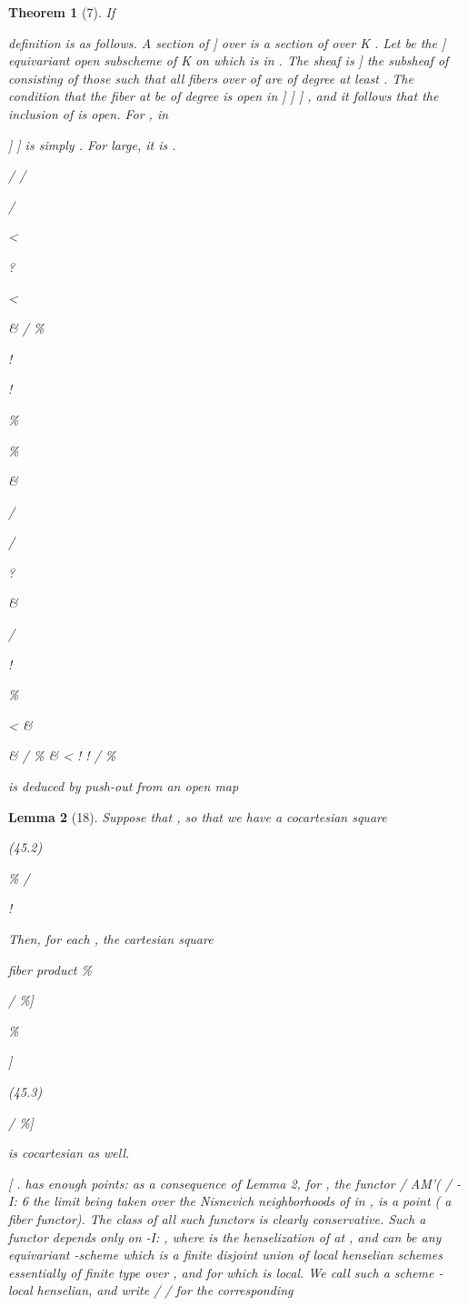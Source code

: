 \documentclass[11pt,a4paper]{article}
\theoremstyle{plain}
\newtheorem{theorem}{Theorem}
\newtheorem{lemma}[theorem]{Lemma}
\theoremstyle{definition}
\begin{document}
\begin{theorem}[7]
If

definition is as follows.
A section of ] over is a section of
over
K . Let
be the
]
equivariant open subscheme of
K on which is in . The sheaf
 is
]
the subsheaf of
consisting of those such that all fibers
over
 of
are of degree at least . The condition that the fiber at be of degree  is open in
]
]
]
, and it follows that the inclusion of
is open. For
,
 in

]
]
is simply
. For large, it is
.

/
/



/

<

?

<

\&
/ \%

!

!

\%

\%

\&

/

/

?

\&

/

!

\%

<
\&

\&
/ \%
\& <
!
!  / \%

is deduced by push-out from an open map
\end{theorem}

\begin{lemma}[18]
Suppose that
, so that we have a cocartesian square



  



(45.2)

\%  /

!

Then, for each , the cartesian square

fiber product  \%




/ \%] 



  \%


]


(45.3)

/ \%]

is cocartesian as well.

[ .   has enough points: as a consequence of Lemma 2, for
   , the functor
/  AM'( / -I: 6 
the limit being taken over the Nisnevich neighborhoods of  in  , is a point ( a
fiber functor). The class of all such functors is clearly conservative. Such a functor
depends only on 
 -I:   , where   is the henselization of 
at  , and  can be any equivariant  -scheme which is a finite disjoint union of local
henselian schemes essentially of finite type over  , and for which  is local. We
call such a scheme -local henselian, and write /  /  for the corresponding
\end{lemma}
\end{document}
